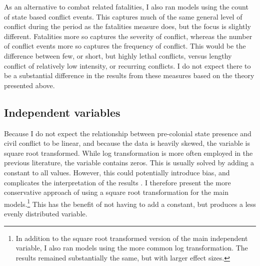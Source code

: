 \documentclass[12pt]{article}
\begin{document}
As an alternative to combat related fatalities, I also ran models using the
count of state based conflict events. This captures much of the same general
level of conflict during the period as the fatalities measure does, but the
focus is slightly different. Fatalities more so captures the severity of
conflict, whereas the number of conflict events more so captures the frequency
of conflict. This would be the difference between few, or short, but highly
lethal conflicts, versus lengthy conflict of relatively low intensity, or
recurring conflicts. I do not expect there to be a substantial difference in the
results from these measures based on the theory presented above.


\subsection{Independent variables} \label{Independent variable}


Because I do not expect the relationship between pre-colonial state presence and
civil conflict to be linear, and because the data is heavily skewed, the
variable is square root transformed. While log transformation is more often
employed in the previous literature, the variable contains zeros. This is
usually solved by adding a constant to all values. However, this could
potentially introduce bias, and complicates the interpretation of the results
\citep{Ekwaru_2018}. I therefore present the more conservative approach of using
a square root transformation for the main models.\footnote{In addition to the
	square root transformed version of the main independent variable, I also
	ran models using the more common log transformation. The results
remained substantially the same, but with larger effect sizes.} This has the
benefit of not having to add a constant, but produces a less evenly distributed
variable. 
\end{document}
